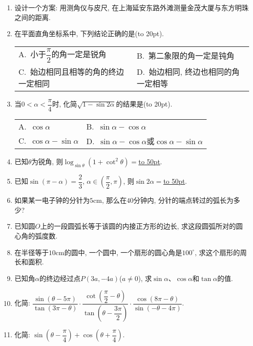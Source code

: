 \documentclass[10pt,a4paper]{article}
\newcommand{\blank}[1]{\underline{\hbox to #1pt{}}}
\newcommand{\bracket}[1]{(\hbox to #1pt{})}
\newcommand{\twoch}[4]{\par\begin{tabular}{p{.46\textwidth}p{.46\textwidth}}
A.~#1& B.~#2\\
C.~#3& D.~#4
\end{tabular}}
\begin{document}
\begin{enumerate}[1.]
\begin{center}
\end{center}
\item 设计一个方案: 用测角仪与皮尺, 在上海延安东路外滩测量金茂大厦与东方明珠之间的距离.
\item 在平面直角坐标系中, 下列结论正确的是\bracket{20}.
\twoch{小于$\dfrac{\pi}2$的角一定是锐角}{第二象限的角一定是钝角}{始边相同且相等的角的终边一定相同}{始边相同, 终边也相同的角一定相等}
\item 当$0<\alpha <\dfrac{\pi}4$时, 化简$\sqrt {1-\sin 2\alpha}$的结果是\bracket{20}.
\twoch{$\cos \alpha$}{$\sin \alpha -\cos \alpha$}{$\cos \alpha -\sin \alpha$}{$\sin \alpha -\cos \alpha$或$\cos \alpha -\sin \alpha$}
\item 已知$\theta$为锐角, 则$\log _{\sin \theta}(1+\cot ^2\theta)=$\blank{50}.
\item 已知$\sin (\pi -\alpha)=\dfrac 23$, $\alpha \in (\dfrac{\pi}2,\pi)$, 则$\sin 2\alpha =$\blank{50}.
\item 如果某一电子钟的分针为$5\text{cm}$, 那么在$40$分钟内, 分针的端点转过的弧长为多少?
\item 已知圆$O$上的一段圆弧长等于该圆的内接正方形的边长, 求这段圆弧所对的圆心角的弧度数.
\item 在半径等于$10\text{cm}$的圆中, 一个圆中, 一个扇形的圆心角是$100^\circ$, 求这个扇形的周长和面积.
\item 已知角$\alpha$的终边经过点$P(3a,-4a)$($a\ne 0$), 求$\sin \alpha$、$\cos \alpha$和$\tan \alpha$的值.
\item 化简: $\dfrac{\sin (\theta -5\pi)}{\tan (3\pi -\theta)}\cdot \dfrac{\cot (\dfrac{\pi}2-\theta)}{\tan (\theta -\dfrac{3\pi}2)}\cdot \dfrac{\cos (8\pi -\theta)}{\sin (-\theta -4\pi)}$.
\item 化简: $\sin (\theta -\dfrac{\pi}4)+\cos (\theta +\dfrac{\pi}4)$.

\end{enumerate}
\end{document}
